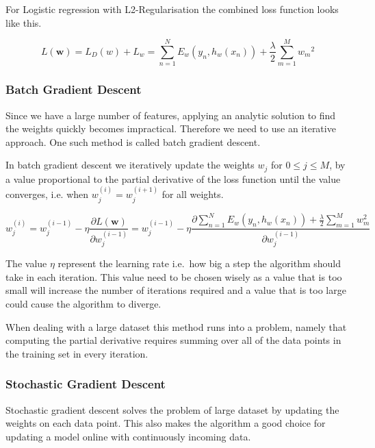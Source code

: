 For Logistic regression with L2-Regularisation the combined loss function looks like this.

\[ L(\textbf{w})
  = L_D(w) + L_w 
  = \sum_{n=1}^N E_w(y_n, h_w(x_n)) + \frac{\lambda}{2} \sum_{m=1}^{M} {w_m}^2 \] 

\subsubsection{Batch Gradient Descent}\label{sec:batch}

Since we have a large number of features, applying an analytic solution to find the weights quickly becomes impractical.
Therefore we need to use an iterative approach.
One such method is called batch gradient descent.

In batch gradient descent we iteratively update the weights $w_j$ for $0 \leq j \leq M$, by a value proportional to the partial derivative of the loss function until the value converges, i.e. when $w_{j}^{(i)} = w_j^{(i+1)}$ for all weights.


\[ w_j^{(i)} = w_j^{(i-1)} - \eta \frac{\partial L(\textbf{w})}{\partial w_j^{(i-1)}}
       = w_{j}^{(i-1)} - \eta \frac{\partial \sum_{n=1}^N E_w(y_n, h_w(x_n)) + \frac{\lambda}{2}\sum_{m=1}^M w_m^2}{\partial w_j^{(i-1)}} \]  

The value $\eta$ represent the learning rate i.e.\ how big a step the algorithm should take in each iteration.
This value need to be chosen wisely as a value that is too small will increase the number of iterations required and a value that is too large could cause the algorithm to diverge.

When dealing with a large dataset this method runs into a problem, namely that computing the partial derivative requires summing over all of the data points in the training set in every iteration. 

\subsubsection{Stochastic Gradient Descent}\label{sec:stochastic}

Stochastic gradient descent solves the problem of large dataset by updating the weights on each data point.
This also makes the algorithm a good choice for updating a model online with continuously incoming data. 

